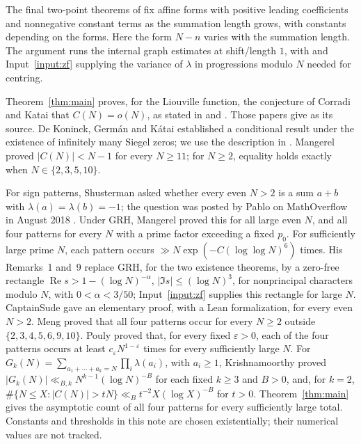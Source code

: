 \documentclass[11pt]{article}
\theoremstyle{definition}
\DeclareMathOperator{\Rea}{Re}
\begin{document}
The final two-point theorems of \cite{OpenAI007} fix affine forms
with positive leading coefficients and nonnegative constant terms
as the summation length grows, with constants depending on the forms.
Here the form $N-n$ varies with the summation length.
The argument runs the internal graph estimates at shift/length $1$,
with \cite{KMT} and Input~\ref{input:zf} supplying the variance of
$\lambda$ in progressions modulo $N$ needed for centring.

Theorem~\ref{thm:main} proves, for the Liouville function, the conjecture
of Corradi and Katai that $C(N)=o(N)$, as stated in
\cite[\S1.1]{Mangerel2024} and \cite[Conjecture~1]{Krishnamoorthy2026}.
Those papers give \cite{CK69} as its source.
De Koninck, Germ\'an and K\'atai \cite{DGK15} established a conditional
result under the existence of infinitely many Siegel zeros; we use the
description in \cite[\S1.1]{Mangerel2024}.
Mangerel \cite[Theorem~1.2]{Mangerel2024} proved $|C(N)|<N-1$ for every
$N\ge11$; for $N\ge2$, equality holds exactly when
$N\in\{2,3,5,10\}$.

For sign patterns, Shusterman asked whether every even $N>2$ is a sum
$a+b$ with $\lambda(a)=\lambda(b)=-1$; the question was posted by Pablo
on MathOverflow in August 2018 \cite{MO}.
Under GRH, Mangerel \cite[Theorems~1.2--1.3 and Proposition~1.4]{MangerelGRH}
proved this for all large even $N$, and all four patterns for every $N$
with a prime factor exceeding a fixed $p_0$. For sufficiently large
prime $N$, each pattern occurs $\gg N\exp(-C(\log\log N)^6)$ times.
His Remarks~1 and~9 replace GRH, for the two existence theorems, by
a zero-free rectangle
$\Rea s>1-(\log N)^{-\alpha}$, $|\Im s|\le(\log N)^3$,
for nonprincipal characters modulo $N$, with $0<\alpha<3/50$;
Input~\ref{input:zf} supplies this rectangle for large $N$.
CaptainSude \cite[Theorem~1.1]{CaptainSude} gave an elementary proof,
with a Lean formalization, for every even $N>2$.
Meng \cite[Theorem~A]{Meng2026} proved that all four patterns occur
for every $N\ge2$ outside $\{2,3,4,5,6,9,10\}$.
Pouly \cite[Theorem~1.1]{Pouly2026} proved that, for every fixed
$\varepsilon>0$, each of the four patterns occurs at least
$c_\varepsilon N^{1-\varepsilon}$ times for every sufficiently large $N$.
For $G_k(N)=\sum_{a_1+\cdots+a_k=N}\prod_i\lambda(a_i)$, with $a_i\ge1$,
Krishnamoorthy \cite[Theorems~1--2]{Krishnamoorthy2026} proved
$|G_k(N)|\ll_{B,k}N^{k-1}(\log N)^{-B}$ for each fixed $k\ge3$ and $B>0$,
and, for $k=2$,
$\#\{N\le X:|C(N)|>tN\}\ll_B t^{-2}X(\log X)^{-B}$ for $t>0$.
Theorem~\ref{thm:main} gives the asymptotic count of all four patterns
for every sufficiently large total. Constants and thresholds in this
note are chosen existentially; their numerical values are not tracked.
\end{document}
